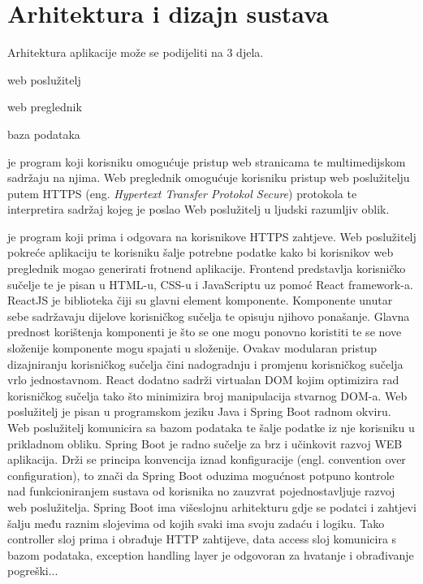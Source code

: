 \chapter{Arhitektura i dizajn sustava}
		


	
	Arhitektura aplikacije može se podijeliti na 3 djela. 
	
	\begin{packed_item}
		\item web poslužitelj
		
		\item web preglednik
		
		\item baza podataka
	
	\end{packed_item}
	
	 je program koji korisniku omogućuje pristup web stranicama te multimedijskom sadržaju na njima. Web preglednik omogućuje korisniku pristup web poslužitelju putem HTTPS (eng. \textit{Hypertext Transfer Protokol Secure}) protokola te interpretira sadržaj kojeg je poslao Web poslužitelj u ljudski razumljiv oblik.
	
	 je program koji prima i odgovara na korisnikove HTTPS zahtjeve. Web poslužitelj pokreće aplikaciju te korisniku šalje potrebne podatke kako bi korisnikov web preglednik mogao generirati frotnend aplikacije. Frontend predstavlja korisničko sučelje te je pisan u HTML-u, CSS-u i JavaScriptu uz pomoć React framework-a. ReactJS je biblioteka čiji su glavni element komponente. Komponente unutar sebe sadržavaju dijelove korisničkog sučelja te opisuju njihovo ponašanje. Glavna prednost korištenja komponenti je što se one mogu ponovno koristiti te se nove složenije komponente mogu spajati u složenije. Ovakav modularan pristup dizajniranju korisničkog sučelja čini nadogradnju i promjenu korisničkog sučelja vrlo jednostavnom. React dodatno sadrži virtualan DOM kojim optimizira rad korisničkog sučelja tako što minimizira broj manipulacija stvarnog DOM-a. Web poslužitelj je pisan u programskom jeziku Java i Spring Boot radnom okviru. Web poslužitelj komunicira sa bazom podataka te šalje podatke iz nje korisniku u prikladnom obliku. Spring Boot je radno sučelje za brz i učinkovit razvoj WEB aplikacija. Drži se principa konvencija iznad konfiguracije (engl. convention over configuration), to znači da Spring Boot oduzima mogućnost potpuno kontrole nad funkcioniranjem sustava od korisnika no zauzvrat pojednostavljuje razvoj web poslužitelja. Spring Boot ima višeslojnu  arhitekturu gdje se podatci i zahtjevi šalju među raznim slojevima od kojih svaki ima svoju zadaću i logiku. Tako controller sloj prima i obrađuje HTTP zahtijeve, data access sloj komunicira s bazom podataka, exception handling layer je odgovoran za hvatanje i obrađivanje pogreški...
	

